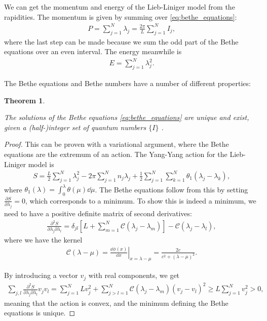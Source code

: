 \documentclass[11pt, a4paper]{report} %
\newtheorem{theorem}{Theorem}
\begin{document}
We can get the momentum and energy of the Lieb-Liniger model from the rapidities. The momentum is given by summing over \cref{eq:bethe_equations}:
\begin{align}
  P = \sum_{j=1}^N \lambda_j = \frac{2\pi}{L}\sum_{j=1}^N I_j,
\end{align}
where the last step can be made because we sum the odd part of the Bethe equations over an even interval.
The energy meanwhile is~\cite{Korepin1993}
\begin{align}
  E = \sum_{j=1}^{N}\lambda_j^2.
\end{align}

The Bethe equations and Bethe numbers have a number of different properties:

\begin{theorem}\label{th:convexity}
\begin{sloppypar}
\noindent
The solutions of the Bethe equations \cref{eq:bethe_equations} are unique and exist, given a \mbox{(half-)integer} set of quantum numbers \(\{I\}\) \textup{\cite{Yang1969}}.
\end{sloppypar}
\end{theorem}
\begin{proof}
This can be proven with a variational argument, where the Bethe equations are the extremum of an action.
The Yang-Yang action for the Lieb-Liniger model is
\begin{align}
	S= \frac{L}{2} \sum_{j=1}^{N} \lambda_j^2 - 2\pi\sum_{j=1}^{N} n_j \lambda_j + \frac{1}{2} \sum_{j=1}^N \sum_{k=1}^{N} \theta_1(\lambda_j - \lambda_k),
\end{align}
where \(\theta_1(\lambda) = \int_0^{\lambda} \theta(\mu)\dd\mu\).
The Bethe equations follow from this by setting \(\frac{\partial S}{\partial \lambda_j} = 0\), which corresponds to a minimum.
To show this is indeed a minimum, we need to have a positive definite matrix of second derivatives:
\begin{align}
	\frac{\partial^2S}{\partial\lambda_j\partial\lambda_l} = \delta_{jl} \left[L + \sum_{m=1}^{N} \mathcal{C}(\lambda_j-\lambda_m)\right] - \mathcal{C}(\lambda_j- \lambda_l),
\end{align}
where we have the kernel
\begin{align}
	\mathcal{C}(\lambda - \mu) = \left.\frac{\dd \phi(x)}{\dd x} \right|_{x=\lambda-\mu} = \frac{2c}{c^2 + (\lambda - \mu)^2}.
\end{align}

By introducing a vector \(v_j\) with real components, we get~\cite{Korepin1993}
\begin{align}
  	\sum_{j,l}\frac{\partial^2S}{\partial\lambda_j\partial\lambda_l} v_jv_l = \sum_{j=1}^NL v_{j}^2 + \sum_{j>l=1}^{N} \mathcal{C}(\lambda_j-\lambda_m) (v_j - v_l)^2 \geq L \sum_{j=1}^Nv_j^{2} > 0,
\end{align}
meaning that the action is convex, and the minimum defining the Bethe equations is unique.
\end{proof}
\end{document}
